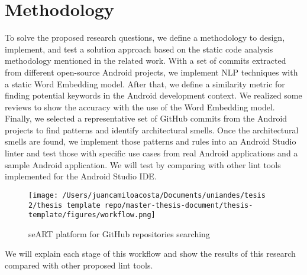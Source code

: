 \section{Methodology}
To solve the proposed research questions, we define a methodology to design, implement, and test a solution approach based on the static code analysis methodology mentioned in the related work. With a set of commits extracted from different open-source Android projects, we implement NLP techniques with a static Word Embedding model. After that, we define a similarity metric for finding potential keywords in the Android development context. We realized some reviews to show the accuracy with the use of the Word Embedding model. Finally, we selected a representative set of GitHub commits from the Android projects to find patterns and identify architectural smells. Once the architectural smells are found, we implement those patterns and rules into an Android Studio linter and test those with specific use cases from real Android applications and a sample Android application. We will test by comparing with other lint tools implemented for the Android Studio IDE.

\begin{figure}[h]
    	\centering
    		\texttt{[image: /Users/juancamiloacosta/Documents/uniandes/tesis 2/thesis template repo/master-thesis-document/thesis-template/figures/workflow.png]}
   			 \caption{seART platform for GitHub repositories searching \cite{} }
   			 \label{fig:ast}
\end{figure}


We will explain each stage of this workflow and show the results of this research compared with other proposed lint tools.

